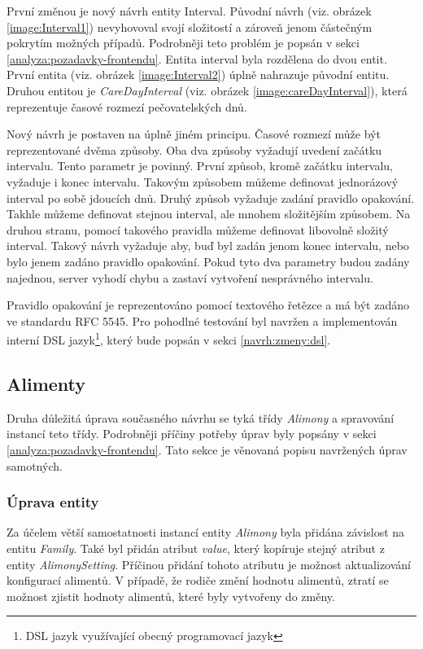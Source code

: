         První změnou je nový návrh entity Interval. Původní návrh (viz. obrázek \ref{image:Interval1}) nevyhovoval svojí složitostí a zároveň jenom částečným pokrytím možných případů. Podrobněji teto problém je popsán v sekci \ref{analyza:pozadavky-frontendu}. Entita interval byla rozdělena do dvou entit. První entita (viz. obrázek \ref{image:Interval2}) úplně nahrazuje původní entitu. Druhou entitou je \textit{CareDayInterval} (viz. obrázek \ref{image:careDayInterval}), která reprezentuje časové rozmezí pečovatelských dnů.
    
        Nový návrh je postaven na úplně jiném principu. Časové rozmezí může být reprezentované dvěma způsoby. Oba dva způsoby vyžadují uvedení začátku intervalu. Tento parametr je povinný. První způsob, kromě začátku intervalu, vyžaduje i konec intervalu. Takovým způsobem můžeme definovat jednorázový interval po sobě jdoucích dnů. Druhý způsob vyžaduje zadání pravidlo opakování. Takhle můžeme definovat stejnou interval, ale mnohem složitějším způsobem. Na druhou stranu, pomocí takového pravidla můžeme definovat libovolně složitý interval. Takový návrh vyžaduje aby, buď byl zadán jenom konec intervalu, nebo bylo jenem zadáno pravidlo opakování. Pokud tyto dva parametry budou zadány najednou, server vyhodí chybu a zastaví vytvoření nesprávného intervalu.
    
        Pravidlo opakování je reprezentováno pomocí textového řetězce a má být zadáno ve standardu {RFC 5545}\cite{recurrence-rule}. Pro pohodlné testování byl navržen a implementován {interní DSL jazyk}\footnote{DSL jazyk využívající obecný programovací jazyk}, který bude popsán v sekci \ref{navrh:zmeny:dsl}.
        
    \subsection{Alimenty}\label{navrh:upravy:alimenty}
        Druha důležitá úprava současného návrhu se tyká třídy \textit{Alimony} a spravování instancí teto třídy. Podrobněji příčiny potřeby úprav byly popsány v sekci \ref{analyza:pozadavky-frontendu}. Tato sekce je věnovaná popisu navržených úprav samotných.
    
        \subsubsection{Úprava entity}
            Za účelem větší samostatnosti instancí entity \textit{Alimony} byla přidána závislost na entitu \textit{Family}. Také byl přidán atribut \textit{value}, který kopíruje stejný atribut z entity \textit{AlimonySetting}. Příčinou přidání tohoto atributu je možnost aktualizování konfigurací alimentů. V případě, že rodiče změní hodnotu alimentů, ztratí se možnost zjistit hodnoty alimentů, které byly vytvořeny do změny.
            
